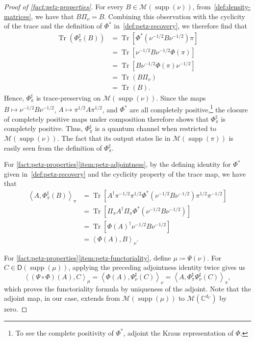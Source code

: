 \documentclass[11pt]{article}
\theoremstyle{remark}
\newcommand{\cM}{\mathcal{M}}
\newcommand{\C}{\mathbb{C}}
\newcommand{\Tr}{\operatorname{Tr}}
\newcommand{\supp}{\operatorname{supp}}
\newcommand{\Dens}{\mathsf{D}}
\newcommand{\inner}[2]{\left\langle #1, #2\right\rangle}
\begin{document}
\begin{proof}[Proof of \cref{fact:petz-properties}]
For every $B \in \cM(\supp(\nu))$, from~\cref{def:density-matrices}, we have that $B\Pi_\nu = B$. Combining this observation with the cyclicity of the trace and the definition of $\Phi^*$ in~\cref{def:petz-recovery}, we therefore find that
\begin{align*}
\Tr(\Phi_\pi^\sharp(B))
&= \Tr\left[\Phi^*\left(\nu^{-1/2}B\nu^{-1/2}\right)\pi\right] \\
&= \Tr\left[\nu^{-1/2}B\nu^{-1/2}\Phi(\pi)\right] \\
&= \Tr\left[B\nu^{-1/2}\Phi(\pi)\nu^{-1/2}\right] \\
&= \Tr(B\Pi_\nu) \\
&= \Tr(B).
\end{align*}
Hence, $\Phi_\pi^\sharp$ is trace-preserving on $\cM(\supp(\nu))$. Since the maps $B \mapsto \nu^{-1/2} B \nu^{-1/2}$, $A \mapsto \pi^{1/2} A \pi^{1/2}$, and $\Phi^*$ are all completely positive,\footnote{To see the complete positivity of $\Phi^*$, adjoint the Kraus representation of $\Phi$.} the closure of completely positive maps under composition therefore shows that $\Phi_\pi^\sharp$ is completely positive. Thus, $\Phi_\pi^\sharp$ is a quantum channel when restricted to $\cM(\supp(\nu))$. The fact that its output states lie in $\cM(\supp(\pi))$ is easily seen from the definition of $\Phi_\pi^\sharp$.

For \cref{fact:petz-properties}\ref{item:petz-adjointness}, by the defining identity for $\Phi^*$ given in~\cref{def:petz-recovery} and the cyclicity property of the trace map, we have that
\begin{align*}
\inner{A}{\Phi_\pi^\sharp(B)}_\pi 
&= \Tr\left[A^\dagger \pi^{-1/2}\pi^{1/2} \Phi^*\left(\nu^{-1/2}B\nu^{-1/2}\right)\pi^{1/2}\pi^{-1/2}\right] \\
&= \Tr\left[\Pi_\pi A^\dagger \Pi_\pi \Phi^*\left(\nu^{-1/2}B\nu^{-1/2}\right)\right] \\
&= \Tr\left[\Phi(A)^\dagger\nu^{-1/2}B\nu^{-1/2}\right] \\
&= \inner{\Phi(A)}{B}_\nu.
\end{align*}

For \cref{fact:petz-properties}\ref{item:petz-functoriality}, define $\mu \coloneqq \Psi(\nu)$. For $C \in \Dens(\supp(\mu))$, applying the preceding adjointness identity twice gives us
\begin{equation*}
\inner{(\Psi\circ\Phi)(A)}{C}_\mu
= \inner{\Phi(A)}{\Psi_\nu^\sharp(C)}_\nu
= \inner{A}{\Phi_\pi^\sharp\Psi_\nu^\sharp(C)}_\pi,
\end{equation*}
which proves the functoriality formula by uniqueness of the adjoint. Note that the adjoint map, in our case, extends from $\cM(\supp(\mu))$ to $\cM(\C^{d_C})$ by zero.


\end{proof}
\end{document}
